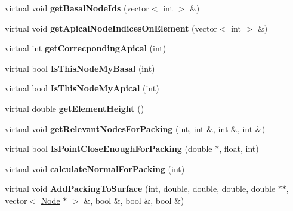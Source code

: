 \begin{DoxyCompactItemize}
\item 
\hypertarget{classShapeBase_a72532efab3de3fced996c4514881025c}{}virtual void {\bfseries get\+Basal\+Node\+Ids} (vector$<$ int $>$ \&)\label{classShapeBase_a72532efab3de3fced996c4514881025c}

\item 
\hypertarget{classShapeBase_a84d9740a94b185e9ce26e5f4541b2b14}{}virtual void {\bfseries get\+Apical\+Node\+Indices\+On\+Element} (vector$<$ int $>$ \&)\label{classShapeBase_a84d9740a94b185e9ce26e5f4541b2b14}

\item 
\hypertarget{classShapeBase_af50dc1099b17b67a2e196724b74eab4e}{}virtual int {\bfseries get\+Correcponding\+Apical} (int)\label{classShapeBase_af50dc1099b17b67a2e196724b74eab4e}

\item 
\hypertarget{classShapeBase_aeeaf86469ce03277c978e0fd739e3751}{}virtual bool {\bfseries Is\+This\+Node\+My\+Basal} (int)\label{classShapeBase_aeeaf86469ce03277c978e0fd739e3751}

\item 
\hypertarget{classShapeBase_acede81712d5205c96fcd6acdaa574368}{}virtual bool {\bfseries Is\+This\+Node\+My\+Apical} (int)\label{classShapeBase_acede81712d5205c96fcd6acdaa574368}

\item 
\hypertarget{classShapeBase_a995a5e6a553ed0cdaadf74dab4f88822}{}virtual double {\bfseries get\+Element\+Height} ()\label{classShapeBase_a995a5e6a553ed0cdaadf74dab4f88822}

\item 
\hypertarget{classShapeBase_a3fd943415e0e35cb8f19e88bb5e67fe4}{}virtual void {\bfseries get\+Relevant\+Nodes\+For\+Packing} (int, int \&, int \&, int \&)\label{classShapeBase_a3fd943415e0e35cb8f19e88bb5e67fe4}

\item 
\hypertarget{classShapeBase_a44db2ec9cd790c4fa9782c4117f9d0fe}{}virtual bool {\bfseries Is\+Point\+Close\+Enough\+For\+Packing} (double $\ast$, float, int)\label{classShapeBase_a44db2ec9cd790c4fa9782c4117f9d0fe}

\item 
\hypertarget{classShapeBase_a75ec5e0c21ee757e72bd9327c35fbdc5}{}virtual void {\bfseries calculate\+Normal\+For\+Packing} (int)\label{classShapeBase_a75ec5e0c21ee757e72bd9327c35fbdc5}

\item 
\hypertarget{classShapeBase_afedefe13ce568fa19e5a2ae46a1de4ed}{}virtual void {\bfseries Add\+Packing\+To\+Surface} (int, double, double, double, double $\ast$$\ast$, vector$<$ \hyperlink{classNode}{Node} $\ast$ $>$ \&, bool \&, bool \&, bool \&)\label{classShapeBase_afedefe13ce568fa19e5a2ae46a1de4ed}


\end{DoxyCompactItemize}
